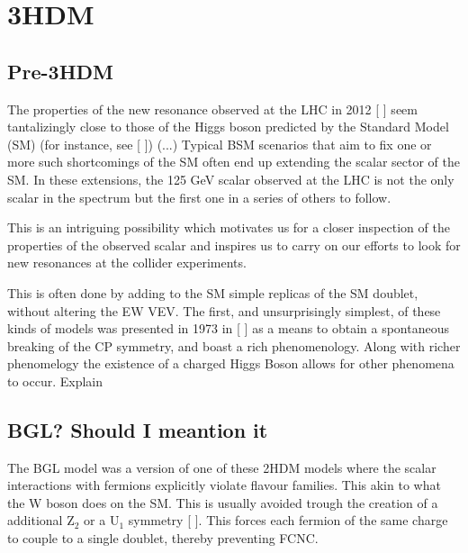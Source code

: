 
\newpage 


\chapter{3HDM}

\section{Pre-3HDM}

The properties of the new resonance observed at the LHC in 2012 [
] seem tantalizingly close to those of the
Higgs boson predicted by the Standard Model (SM) (for instance, see [
]) (...)  
Typical BSM scenarios that aim to fix one or more such shortcomings of the SM often end up extending the scalar
sector of the SM. In these extensions, the 125 GeV scalar observed at the LHC is not the only scalar in the spectrum but the first one in a series of others to follow.

This is an intriguing possibility which motivates us
for a closer inspection of the properties of the observed scalar and inspires us to carry on our efforts to look for
new resonances at the collider experiments.

This is often done by adding to the SM simple replicas of the SM doublet, without altering the EW VEV. The first, and unsurprisingly simplest, of these kinds of models was presented in 1973 in [
] as a means to obtain a spontaneous breaking of the CP symmetry, and boast a rich phenomenology. Along with richer phenomelogy the existence of a charged Higgs Boson allows for other phenomena to occur. {\color{red} Explain} 

\section{BGL? Should I meantion it}

The BGL model was a version of one of these 2HDM models where the scalar interactions with fermions explicitly violate flavour families. This akin to what the W boson does on the SM. This is usually avoided trough the creation of a additional $\mathrm{Z}_2$  or a $\mathrm{U}_1$ symmetry [
]. This forces each fermion of the same charge to couple to a single doublet, thereby preventing FCNC.


